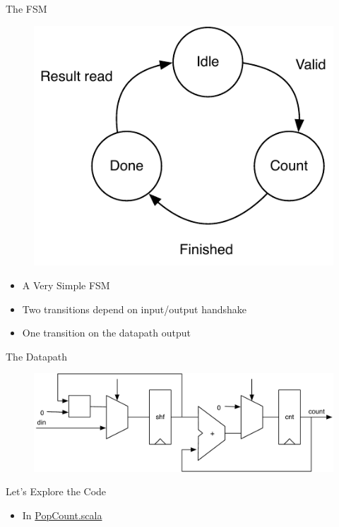\begin{frame}[fragile]{The FSM}
\begin{figure}
  \includegraphics[scale=\scale]{../figures/popcnt-states}
\end{figure}
\begin{itemize}
\item A Very Simple FSM
\item Two transitions depend on input/output handshake
\item One transition on the datapath output
\end{itemize}
\end{frame}

\begin{frame}[fragile]{The Datapath}
\begin{figure}
  \includegraphics[scale=0.65]{../figures/popcnt-data}
\end{figure}
\end{frame}

\begin{frame}[fragile]{Let's Explore the Code}
\begin{itemize}
\item In \href{https://github.com/schoeberl/chisel-book/blob/master/src/main/scala/PopCount.scala}{PopCount.scala}
\end{itemize}
\end{frame}


